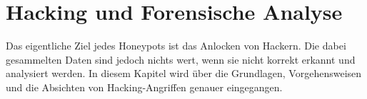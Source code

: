 \chapter{Hacking und Forensische Analyse}

Das eigentliche Ziel jedes Honeypots ist das Anlocken von Hackern. Die dabei gesammelten Daten sind jedoch nichts wert, wenn sie nicht korrekt erkannt und analysiert werden. In diesem Kapitel wird über die Grundlagen, Vorgehensweisen und die Absichten von Hacking-Angriffen genauer eingegangen.




